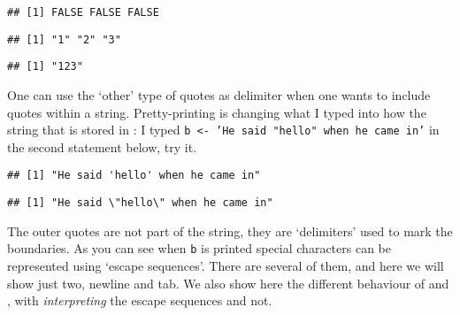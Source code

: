 \documentclass[paper=a4,headsepline,BCOR=12mm,twoside,open=right,%
titlepage,headings=small,fontsize=10pt,index=totoc,bibliography=totoc,%
captions=tableheading,captions=nooneline]{scrbook}\usepackage{knitr}
\begin{document}
\begin{knitrout}\footnotesize
{}\color{fgcolor}\begin{kframe}
\begin{alltt}
 \hlkwb{<-} \hlstd{(}\hlstd{,} \hlstd{,} \hlstd{)}
 \hlkwb{<-} 
 \hlopt{==} 
\end{alltt}
\begin{verbatim}
## [1] FALSE FALSE FALSE
\end{verbatim}
\begin{alltt}
\end{alltt}
\begin{verbatim}
## [1] "1" "2" "3"
\end{verbatim}
\begin{alltt}
\end{alltt}
\begin{verbatim}
## [1] "123"
\end{verbatim}
\end{kframe}
\end{knitrout}

One can use the `other' type of quotes as delimiter when one wants to include quotes within a string. Pretty-printing is changing what I typed into how the string that is stored in \R: I typed \texttt{b <- 'He said "hello" when he came in'} in the second statement below, try it.

\begin{knitrout}\footnotesize
{}\color{fgcolor}\begin{kframe}
\begin{alltt}
 \hlkwb{<-} 
\end{alltt}
\begin{verbatim}
## [1] "He said 'hello' when he came in"
\end{verbatim}
\begin{alltt}
 \hlkwb{<-} 
\end{alltt}
\begin{verbatim}
## [1] "He said \"hello\" when he came in"
\end{verbatim}
\end{kframe}
\end{knitrout}

The outer quotes are not part of the string, they are `delimiters' used to mark the boundaries. As you can see when \texttt{b} is printed special characters can be represented using `escape sequences'. There are several of them, and here we will show just two, newline and tab. We also show here the different behaviour of  and , with  \emph{interpreting} the escape sequences and  not.
\end{document}
